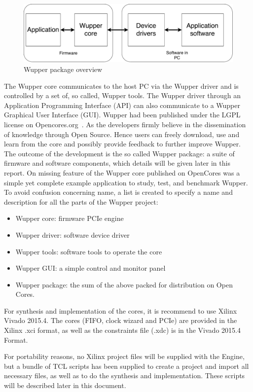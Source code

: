 \begin{figure}[h]
	\centering
	\includegraphics[width = .8 \textwidth]{figures/wupper_package_simple.pdf}	
	\caption{Wupper package overview}
	\label{fig:simplewupperpackage1}
\end{figure}
The Wupper core communicates to the host PC via the Wupper driver and is controlled by a set of, so called, Wupper tools. The Wupper driver through an Application Programming Interface (API) can also communicate to a Wupper Graphical User Interface (GUI). Wupper had been published under the LGPL license on Opencores.org~\cite{opencores}. As the developers firmly believe in the dissemination of knowledge through Open Source. Hence users can freely download, use and learn from the core and possibly provide feedback to further improve Wupper. The outcome of the development is the so called Wupper package: a suite of firmware and software components, which details will be given later in this report. On missing feature of the Wupper core published on OpenCores was a simple yet complete example application to study, test, and benchmark Wupper. To avoid confusion concerning name, a list is created to specify a name and description for all the parts of the Wupper project:

\begin{itemize}
	\item Wupper core: firmware PCIe engine
	\item Wupper driver: software device driver
	\item Wupper tools: software tools to operate the core
	\item Wupper GUI: a simple control and monitor panel
	\item Wupper package: the sum of the above packed for distribution on Open Cores.
\end{itemize}

For synthesis and implementation of the cores, it is recommend to use Xilinx Vivado 2015.4. The cores (FIFO, clock wizard and PCIe) are provided in the Xilinx .xci format, as well as the constraints file (.xdc) is in the Vivado 2015.4 Format.

For portability reasons, no Xilinx project files will be supplied with the Engine, but a bundle of TCL scripts has been supplied to create a project and import all necessary files, as well as to do the synthesis and implementation. These scripts will be described later in this document.


\newpage